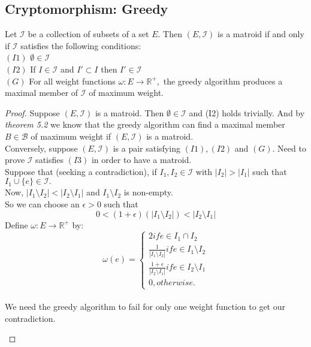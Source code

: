 \documentclass[../main.tex]{subfiles}
\begin{document}
\subsection{Cryptomorphism: Greedy}
\begin{thm}
Let $\mathcal{I}$ be a collection of subsets of a set $E.$ Then $(E,\mathcal{I})$ is a matroid if and only if $\mathcal{I}$ satisfies the following conditions:\\
$(I1)$ $\emptyset \in \mathcal{I}$\\
$(I2)$ If $I \in \mathcal{I}$ and $I' \subset I$ then $I' \in \mathcal{I}$\\
$(G)$ For all weight functions $\omega:E \longrightarrow \mathbb{R^+},$ the greedy algorithm produces a maximal member of $\mathcal{I}$ of maximum weight.
\end{thm}
\begin{proof}
Suppose $(E,\mathcal{I})$ is a matroid. Then $\emptyset \in \mathcal{I}$ and (I2) holds trivially.
And by \textit{theorem 5.2} we know that the greedy algorithm can find a maximal member $B \in \mathcal{B}$ of maximum weight if $(E,\mathcal{I})$ is a matroid.\\
Conversely, suppose $(E,\mathcal{I})$ is a pair satisfying $(I1),(I2)$ and $(G).$ Need to prove $\mathcal{I}$ satisfies $(I3)$ in order to have a matroid.\\
Suppose that (seeking a contradiction), if $I_1,I_2 \in \mathcal{I}$ with $|I_2|>|I_1|$ such that $I_1 \cup \{e\} \in \mathcal{I}.$\\
Now, $|I_1 \setminus I_2| < |I_2 \setminus I_1|$ and $I_1 \setminus I_2$ is non-empty.\\
So we can choose an $\epsilon>0$ such that
\begin{equation}
0 < (1+\epsilon)(|I_1 \setminus I_2|) < |I_2 \setminus I_1|
\end{equation}
Define $\omega:E \longrightarrow \mathbb{R^+}$ by:
\[
\omega(e) = \begin{cases}
               2 if e \in I_1 \cap I_2 \\
               \frac{1}{|I_1 \setminus I_2|} if e \in I_1 \setminus I_2\\
               \frac{1+\epsilon}{|I_2 \setminus I_1|} if e \in I_2 \setminus I_1 \\
               0, otherwise.
            \end{cases}
\]\\
We need the greedy algorithm to fail for only one weight function to get our contradiction.
\begin{itemize}

\end{itemize}
\end{proof}
\end{document}
